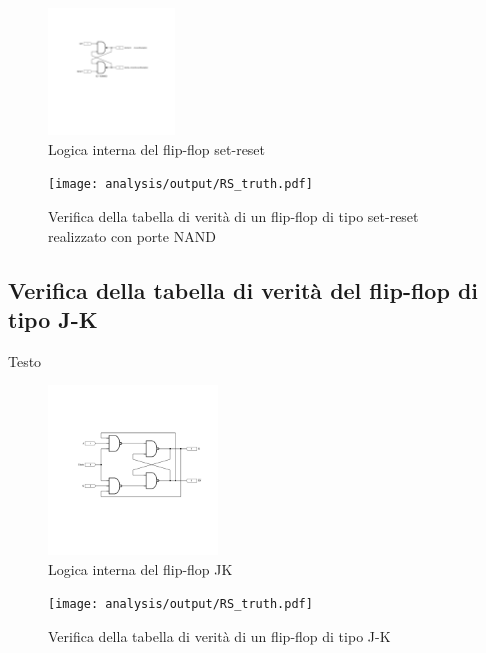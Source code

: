\documentclass[journal]{IEEEtran}
\begin{document}
\begin{figure}[H]%
\begin{center}
\includegraphics[width=0.30\textwidth]{sch-simulations/digital/output/flip-flop-RS.pdf}
\caption{Logica interna del flip-flop set-reset}
\label{fig:circuit_flip_flop}
\end{center}
\end{figure}

\begin{figure}[H]%
\begin{center}
\texttt{[image: analysis/output/RS\_truth.pdf]}
\caption{Verifica della tabella di verità di un flip-flop di tipo set-reset realizzato con porte NAND}
\label{fig:graph_ring_oscillator}
\end{center}
\end{figure}



\subsection{Verifica della tabella di verità del flip-flop di tipo J-K}
Testo

\begin{figure}[H]%
\centering
\begin{center}
\includegraphics[width=0.40\textwidth]{sch-simulations/digital/output/flip-flop-JK.pdf}
\end{center}
\caption{Logica interna del flip-flop JK}
\label{fig:circuit_JK}
\end{figure}

\begin{figure}[H]%
\begin{center}
\texttt{[image: analysis/output/RS\_truth.pdf]}
\caption{Verifica della tabella di verità di un flip-flop di tipo J-K}
\label{fig:graph_ring_oscillator}
\end{center}
\end{figure}
\end{document}
